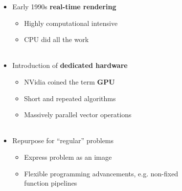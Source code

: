 \documentclass[aspectratio=1610]{beamer}
\begin{document}
\begin{frame}
\begin{columns}
\begin{column}{0.48\textwidth}
\begin{figure}
            \end{figure}
        \end{column}
        \begin{column}{0.48\textwidth}
            \begin{itemize}
                \item Early 1990s \textbf{real-time rendering}
                \begin{itemize}
                    \item Highly computational intensive
                    \item CPU did all the work\\~
                \end{itemize}
                \item Introduction of \textbf{dedicated hardware}
                \begin{itemize}
                    \item NVidia coined the term \textbf{GPU}
                    \item Short and repeated algorithms
                    \item Massively parallel vector operations\\~
                \end{itemize}
                \item Repurpose for ``regular'' problems
                \begin{itemize}
                    \item Express problem as an image
                    \item Flexible programming advancements, e.g. non-fixed function pipelines\\~
                \end{itemize}
            \end{itemize}
        \end{column}
    \end{columns}
\end{frame}
\end{document}
